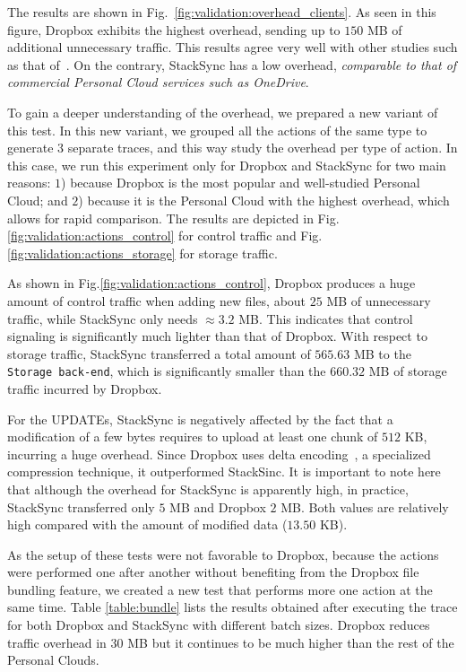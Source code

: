 The results are shown in Fig.~\ref{fig:validation:overhead_clients}. As seen in this
figure, Dropbox exhibits the highest overhead, sending up to $150$ MB of additional
unnecessary traffic. This results agree very well with other studies such as that
of~\cite{li13}. On the contrary, StackSync has a low overhead, \textit{comparable to that of commercial
Personal Cloud services such as OneDrive}.

To gain a deeper understanding of the overhead, we prepared a new variant of
this test. In this new variant, we grouped all the actions of the same type to generate $3$ separate traces,
and this way study the overhead per type of action. In this case, we run this experiment only for Dropbox and StackSync
for two main reasons: $1$) because 
Dropbox is the most popular and well-studied Personal Cloud; and $2$) because
it is the Personal Cloud with the highest overhead, which allows for rapid comparison. 
The results are depicted in Fig.\ref{fig:validation:actions_control} for control traffic and Fig.\ref{fig:validation:actions_storage}
for storage traffic.

As shown in Fig.\ref{fig:validation:actions_control}, Dropbox produces a huge amount of control traffic
when adding new files, about $25$ MB of unnecessary traffic, while StackSync only needs $\approx 3.2$ MB.
This indicates that control signaling is significantly much lighter than that of Dropbox. With respect
to storage traffic, StackSync transferred a total amount of $565.63$ MB to the \texttt{Storage back-end},
which is significantly smaller than the $660.32$ MB of storage traffic incurred by Dropbox.

For the UPDATEs, StackSync is negatively affected by the fact that a modification of a few bytes requires to upload at 
least one chunk of  $512$ KB, incurring a huge overhead. Since Dropbox uses delta encoding~\cite{drago2013benchmarking}, a specialized
compression technique, it outperformed StackSinc. It is important to note here that although the 
overhead for StackSync is apparently high, in practice, StackSync transferred only $5$ MB and Dropbox $2$ MB. 
Both values are relatively high compared with the amount of  modified data ($13.50$ KB). 

As the setup of these tests were not favorable to Dropbox, because the actions were performed one after
another without benefiting from the Dropbox file bundling feature, we created a new test that
performs more one action at the same time. Table \ref{table:bundle} lists
the results obtained after executing the trace for both Dropbox and StackSync with different
batch sizes. Dropbox reduces traffic overhead in $30$ MB but it continues to be much higher than the
rest of the Personal Clouds.

